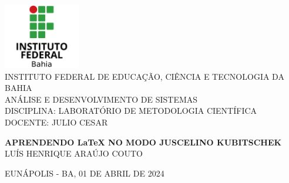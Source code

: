\documentclass[a4paper,12pt]{article}
\begin{document}
    

\begin{titlepage}
    \begin{center}

        \includegraphics[width=0.25\textwidth]{imagens/logoifba.png}\\
        
        INSTITUTO FEDERAL DE EDUCAÇÃO, CIÊNCIA E TECNOLOGIA DA BAHIA\\
      
        ANÁLISE E DESENVOLVIMENTO DE SISTEMAS\\
        
        DISCIPLINA: LABORATÓRIO DE METODOLOGIA CIENTÍFICA\\
        
        DOCENTE: JULIO CESAR\\
        

        \vfill %
        
        \textbf {APRENDENDO LaTeX NO MODO JUSCELINO KUBITSCHEK}\\
        
        LUÍS HENRIQUE ARAÚJO COUTO %
        
        \vfill
        
        EUNÁPOLIS - BA, 01 DE ABRIL DE 2024 %
        
    \end{center}
\end{titlepage}
\end{document}
